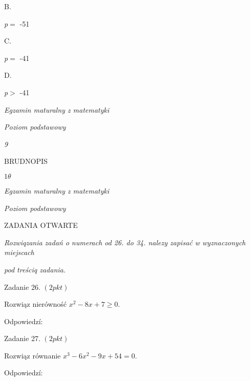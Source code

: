 \documentclass[a4paper,12pt]{article}
\begin{document}
B.

{\it p}$=$ -51

C.

{\it p}$=$ -41

D.

{\it p}$>$ -41





{\it Egzamin maturalny z matematyki}

{\it Poziom podstawowy}

{\it 9}

BRUDNOPIS





$ 1\theta$

{\it Egzamin maturalny z matematyki}

{\it Poziom podstawowy}

ZADANIA OTWARTE

{\it Rozwiqzania zadań o numerach od 26. do 34. nalezy zapisać w wyznaczonych miejscach}

{\it pod treściq zadania}.

Zadanie 26. $(2pkt)$

Rozwiąz nierówność $x^{2}-8x+7\geq 0.$

Odpowiedzí:

Zadanie 27. $(2pkt)$

Rozwiąz równanie $x^{3}-6x^{2}-9x+54=0.$

Odpowiedzí:
\end{document}
